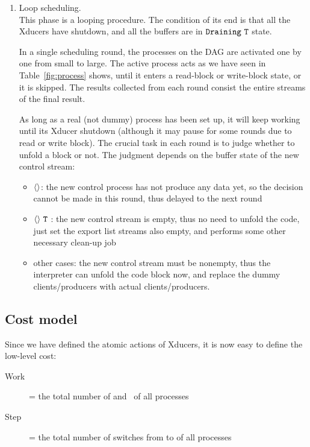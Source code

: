\begin{enumerate}[(1)]
\begin{itemize}
\end{itemize}


\item Loop scheduling. \\ 
This phase is a looping procedure. The condition of its end is that all the Xducers have shutdown, and all the buffers are in $\texttt{Draining} \  \mathtt{T}$ state. 

In a single scheduling round, the processes on the DAG are activated one by one from small to large.
The active process acts as we have seen in Table~\ref{fig:process} shows, until it enters a read-block or write-block state, or it is skipped.  
The results collected from each round consist the entire streams of the final result.

As long as a real (not dummy) process has been set up, it will keep working until its Xducer shutdown (although it may pause for some rounds due to read or write block). 
The crucial task in each round is to judge whether to unfold a \wc block or not. The judgment depends on the buffer state of the new control stream:

\begin{itemize}
	\item \filling$\langle \rangle$: the new control process has not produce any data yet, so the decision cannot be made in this round, thus delayed to the next round
	\item \draining$\langle \rangle \ \mathtt{T}$ : the new control stream is empty, thus no need to unfold the code, just set the export list streams also empty, and performs some other necessary clean-up job  
	\item other cases: the new control stream must be nonempty, thus the interpreter can unfold the code block now, and replace the dummy clients/producers with actual clients/producers.
\end{itemize}







	
\end{enumerate}

\subsection{Cost model}
Since we have defined the atomic actions of Xducers, it is now easy to define the low-level cost:
\begin{description}
	\item[Work] = the total number of \pin and \pout \  of all processes
	\item[Step] = the total number of switches from \filling to \draining of all processes
\end{description}


